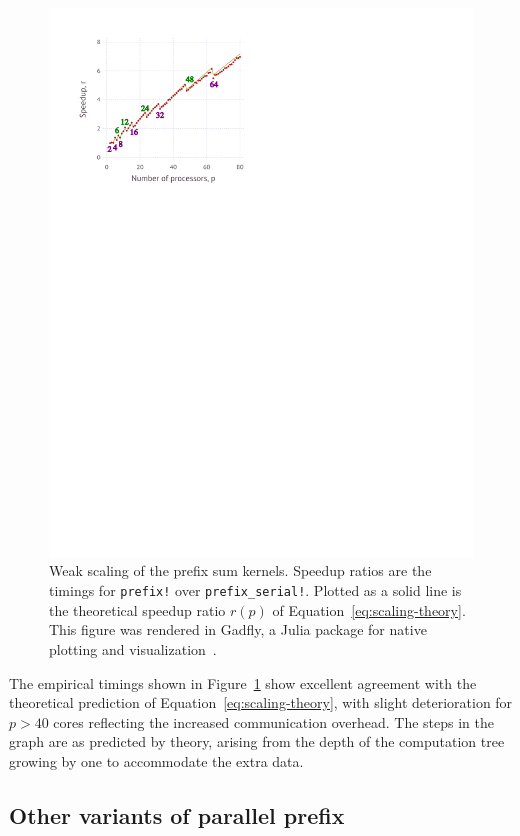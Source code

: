 \documentclass{sig-alternate}
\newcommand{\code}[1]{\texttt{#1}}
\begin{document}
\begin{figure}
  \centering
  \includegraphics[width=0.9\columnwidth]{scaling}
  \caption{Weak scaling of the prefix sum kernels. Speedup ratios are the
  timings for \code{prefix!} over \code{prefix\allowbreak\_serial!}. Plotted as
  a solid line is the theoretical speedup ratio $r(p)$ of
  Equation~\ref{eq:scaling-theory}. This figure was rendered in Gadfly, a
  Julia package for native plotting and visualization~\cite{Gadfly.jl}.}
  \label{fig:scaling}
\end{figure}

The empirical timings shown in Figure~\ref{fig:scaling} show excellent
agreement with the theoretical prediction of Equation~\ref{eq:scaling-theory},
with slight deterioration for $p>40$ cores reflecting the increased
communication overhead. The steps in the graph are as predicted by theory,
arising from the depth of the computation tree growing by one to accommodate
the extra data.

\subsection{Other variants of parallel prefix}
\end{document}
